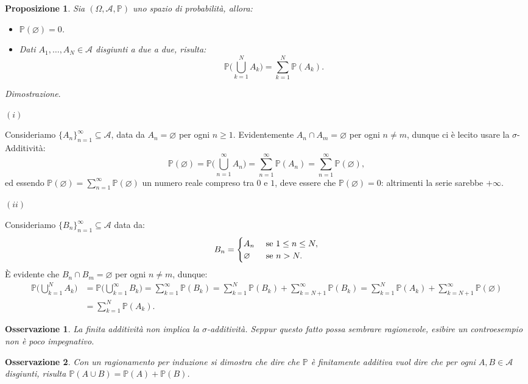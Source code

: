 \documentclass[11pt]{book}
\makeatletter
\theoremstyle{Definizione}
\theoremstyle{TeoremaProposizioneLemmaCorollario}
\newtheorem{mypropo}[myteo]{Proposizione}
\theoremstyle{OsservazioneNota}
\newtheorem{myobs}{Osservazione}[section]
\renewenvironment{proof}[1][\proofname]{\par
  \normalfont \topsep6\p@\@plus6\p@\relax
  \trivlist
  \item[\hskip\labelsep
        \itshape
    #1\@addpunct{.}]\ignorespaces
}{%
  \endtrivlist\@endpefalse
}
\renewcommand{\P}{\mathbb{P}}
\renewenvironment{proof}{\textsl{Dimostrazione}.}{}
\makeatother
\begin{document}
\begin{boxpro}
\begin{mypropo}
Sia $(\Omega,\mathcal{A},\P)$ uno spazio di probabilità, allora:
\begin{itemize}
\item[$(i)$] $\P(\varnothing) = 0$.
\item[$(ii)$] Dati $A_1,\dots,A_N\in \mathcal{A}$ disgiunti a due a due, risulta:
$$
\P\Bigg(\bigcup_{k = 1}^N A_k\Bigg) = \sum_{k = 1}^N \P(A_k).
$$
\end{itemize}
\end{mypropo}
\tcblower
\begin{proof}
\hfill
\begin{flushleft}
$(i)$
\end{flushleft}
Consideriamo $\{A_n\}_{n = 1}^\infty \subseteq \mathcal{A}$, data da $A_n = \varnothing$ per ogni $n\geq 1$. Evidentemente $A_n \cap A_m = \varnothing$ per ogni $n\neq m$, dunque ci è lecito usare la $\sigma$-Additività:
$$
\P(\varnothing) = \P\Bigg(\bigcup_{n = 1}^\infty A_n\Bigg) = \sum_{n = 1}^\infty \P(A_n) = \sum_{n = 1}^\infty \P(\varnothing),
$$
ed essendo $\P(\varnothing) = \sum_{n = 1}^\infty \P(\varnothing)$ un numero reale compreso tra $0$ e $1$, deve essere che $\P(\varnothing) = 0$: altrimenti la serie sarebbe $+\infty$.
\begin{flushleft}
$(ii)$
\end{flushleft}
Consideriamo $\{B_n\}_{n = 1}^\infty \subseteq \mathcal{A}$ data da:
$$
B_n = \begin{cases}
A_n &\textup{ se }1\leq n \leq N,\\
\varnothing &\textup{ se }n>N.
\end{cases}
$$
È evidente che $B_n \cap B_m = \varnothing$ per ogni $n\neq m$, dunque:
\begin{align*}
\P\Bigg(\bigcup_{k = 1}^N A_k\Bigg) &= \P\Bigg(\bigcup_{k = 1}^\infty B_k\Bigg) = \sum_{k = 1}^\infty \P(B_k) = \sum_{k = 1}^N \P(B_k) + \sum_{k = N+1}^\infty \P(B_k) = \sum_{k = 1}^N \P(A_k) + \sum_{k = N+1}^\infty \P(\varnothing)\\
&= \sum_{k = 1}^N \P(A_k).
\end{align*}
\end{proof}
\end{boxpro}
\begin{myobs}
La finita additività non implica la $\sigma$-additività. Seppur questo fatto possa sembrare ragionevole, esibire un controesempio non è poco impegnativo.
\end{myobs}
\begin{myobs}
Con un ragionamento per induzione si dimostra che dire che $\P$ è finitamente additiva vuol dire che per ogni $A,B\in \mathcal{A}$ disgiunti, risulta $\P(A\cup B) = \P(A)+\P(B)$.
\end{myobs}
\end{document}
